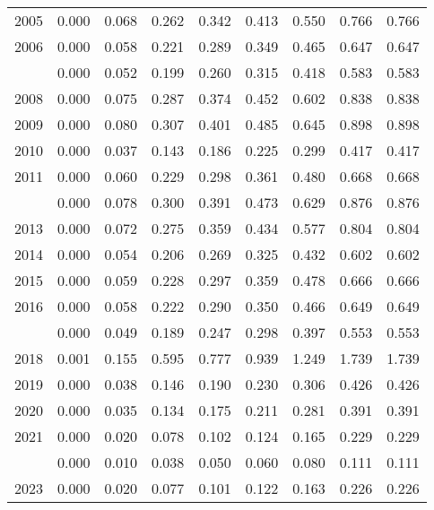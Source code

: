 \documentclass[
]{article}
\begin{document}
\begin{longtable}[t]{lrrrrrrrr}
2005 & 0.000 & 0.068 & 0.262 & 0.342 & 0.413 & 0.550 & 0.766 & 0.766\\
2006 & 0.000 & 0.058 & 0.221 & 0.289 & 0.349 & 0.465 & 0.647 & 0.647\\
\addlinespace
2007 & 0.000 & 0.052 & 0.199 & 0.260 & 0.315 & 0.418 & 0.583 & 0.583\\
2008 & 0.000 & 0.075 & 0.287 & 0.374 & 0.452 & 0.602 & 0.838 & 0.838\\
2009 & 0.000 & 0.080 & 0.307 & 0.401 & 0.485 & 0.645 & 0.898 & 0.898\\
2010 & 0.000 & 0.037 & 0.143 & 0.186 & 0.225 & 0.299 & 0.417 & 0.417\\
2011 & 0.000 & 0.060 & 0.229 & 0.298 & 0.361 & 0.480 & 0.668 & 0.668\\
\addlinespace
2012 & 0.000 & 0.078 & 0.300 & 0.391 & 0.473 & 0.629 & 0.876 & 0.876\\
2013 & 0.000 & 0.072 & 0.275 & 0.359 & 0.434 & 0.577 & 0.804 & 0.804\\
2014 & 0.000 & 0.054 & 0.206 & 0.269 & 0.325 & 0.432 & 0.602 & 0.602\\
2015 & 0.000 & 0.059 & 0.228 & 0.297 & 0.359 & 0.478 & 0.666 & 0.666\\
2016 & 0.000 & 0.058 & 0.222 & 0.290 & 0.350 & 0.466 & 0.649 & 0.649\\
\addlinespace
2017 & 0.000 & 0.049 & 0.189 & 0.247 & 0.298 & 0.397 & 0.553 & 0.553\\
2018 & 0.001 & 0.155 & 0.595 & 0.777 & 0.939 & 1.249 & 1.739 & 1.739\\
2019 & 0.000 & 0.038 & 0.146 & 0.190 & 0.230 & 0.306 & 0.426 & 0.426\\
2020 & 0.000 & 0.035 & 0.134 & 0.175 & 0.211 & 0.281 & 0.391 & 0.391\\
2021 & 0.000 & 0.020 & 0.078 & 0.102 & 0.124 & 0.165 & 0.229 & 0.229\\
\addlinespace
2022 & 0.000 & 0.010 & 0.038 & 0.050 & 0.060 & 0.080 & 0.111 & 0.111\\
2023 & 0.000 & 0.020 & 0.077 & 0.101 & 0.122 & 0.163 & 0.226 & 0.226\\*
\end{longtable}
\end{document}
